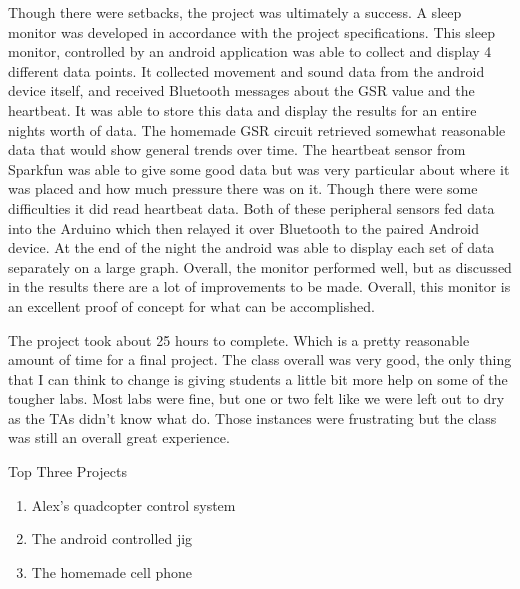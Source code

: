 \documentclass[finalProposal.tex]{subfiles}
\begin{document}
\onehalfspacing


\bigskip

Though there were setbacks, the project was ultimately a success. A sleep monitor was developed in accordance with the project specifications. This sleep monitor, controlled by an android application was able to collect and display 4 different data points. It collected movement and sound data from the android device itself, and received Bluetooth messages about the GSR value and the heartbeat. It was able to store this data and display the results for an entire nights worth of data. The homemade GSR circuit retrieved somewhat reasonable data that would show general trends over time. The heartbeat sensor from Sparkfun was able to give some good data but was very particular about where it was placed and how much pressure there was on it. Though there were some difficulties it did read heartbeat data. Both of these peripheral sensors fed data into the Arduino which then relayed it over Bluetooth to the paired Android device. At the end of the night the android was able to display each set of data separately on a large graph. Overall, the monitor performed well, but as discussed in the results there are a lot of improvements to be made. Overall, this monitor is an excellent proof of concept for what can be accomplished.

The project took about 25 hours to complete. Which is a pretty reasonable amount of time for a final project. The class overall was very good, the only thing that I can think to change is giving students a little bit more help on some of the tougher labs. Most labs were fine, but one or two felt like we were left out to dry as the TAs didn't know what do. Those instances were frustrating but the class was still an overall great experience.

\bigskip

\noindent Top Three Projects
\begin{enumerate}
\item Alex's quadcopter control system
\item The android controlled jig
\item The homemade cell phone
\end{enumerate} 
\end{document}
